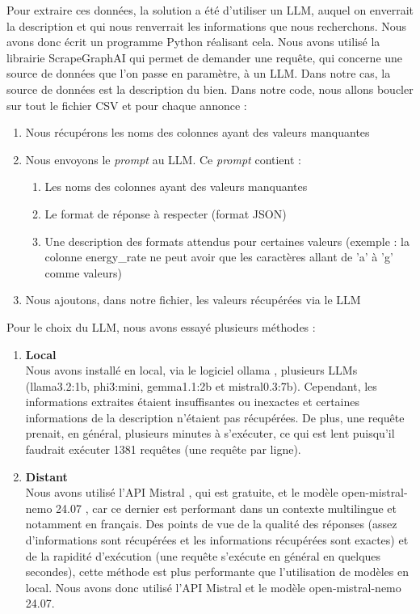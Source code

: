 \documentclass[a4paper, 12pt, twoside]{report}
\begin{document}
		Pour extraire ces données, la solution a été d'utiliser un LLM, auquel on enverrait la description et qui nous renverrait les informations que nous recherchons. 
		Nous avons donc écrit un programme Python réalisant cela. Nous avons utilisé la librairie ScrapeGraphAI \cite{scrapegraphai} qui permet de demander une requête, qui concerne une source de données que l'on passe en paramètre, à un LLM. Dans notre cas, la source de données est la description du bien. Dans notre code, nous allons boucler sur tout le fichier CSV et pour chaque annonce : 
		\begin{enumerate}
			\item Nous récupérons les noms des colonnes ayant des valeurs manquantes
			\item Nous envoyons le {\it prompt} au LLM. Ce {\it prompt} contient :
				\begin{enumerate}
					\item Les noms des colonnes ayant des valeurs manquantes
					\item Le format de réponse à respecter (format JSON)
					\item Une description des formats attendus pour certaines valeurs (exemple : la colonne energy\_rate ne peut avoir que les caractères allant de 'a' à 'g' comme valeurs)
				\end{enumerate}
			\item Nous ajoutons, dans notre fichier, les valeurs récupérées via le LLM \\
		\end{enumerate}

		Pour le choix du LLM, nous avons essayé plusieurs méthodes :
		\begin{enumerate}
			\item {\bf Local} \\
			Nous avons installé en local, via le logiciel ollama \cite{ollama}, plusieurs LLMs (llama3.2:1b, phi3:mini, gemma1.1:2b et mistral0.3:7b). Cependant, les informations extraites étaient insuffisantes ou inexactes et certaines informations de la description n'étaient pas récupérées. De plus, une requête prenait, en général, plusieurs minutes à s'exécuter, ce qui est lent puisqu'il faudrait exécuter 1381 requêtes (une requête par ligne). 
			\item {\bf Distant} \\
			Nous avons utilisé l'API Mistral \cite{mistralai}, qui est gratuite, et le modèle open-mistral-nemo 24.07 \cite{mistralnemo}, car ce dernier est performant dans un contexte multilingue et notamment en français. Des points de vue de la qualité des réponses (assez d'informations sont récupérées et les informations récupérées sont exactes) et de la rapidité d'exécution (une requête s'exécute en général en quelques secondes), cette méthode est plus performante que l'utilisation de modèles en local. Nous avons donc utilisé l'API Mistral et le modèle open-mistral-nemo 24.07. \\
		\end{enumerate}
\end{document}
